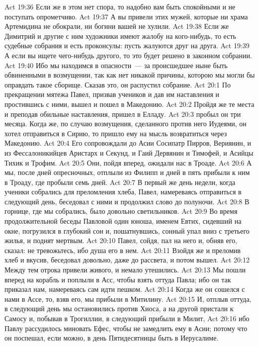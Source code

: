 \vs Act 19:36 Если же в этом нет спора, то надобно вам быть спокойными и не поступать опрометчиво.
\vs Act 19:37 А вы привели этих мужей, которые ни храма Артемидина не обокрали, ни богини вашей не хулили.
\vs Act 19:38 Если же Димитрий и другие с ним художники имеют жалобу на кого-нибудь, то есть судебные собрания и есть проконсулы: пусть жалуются друг на друга.
\vs Act 19:39 А если вы ищете чего-нибудь другого, то это будет решено в законном собрании.
\vs Act 19:40 Ибо мы находимся в опасности~--- за происшедшее ныне быть обвиненными в возмущении, так как нет никакой причины, которою мы могли бы оправдать такое сборище. Сказав это, он распустил собрание.
\vs Act 20:1 По прекращении мятежа Павел, призвав учеников и дав им наставления и простившись с ними, вышел и пошел в Македонию.
\vs Act 20:2 Пройдя же те места и преподав  обильные наставления, пришел в Елладу.
\vs Act 20:3  пробыл он три месяца. Когда же, по случаю возмущения, сделанного против него Иудеями, он хотел отправиться в Сирию, то пришло ему на мысль возвратиться через Македонию.
\vs Act 20:4 Его сопровождали до Асии Сосипатр Пирров, Вериянин, и из Фессалоникийцев Аристарх и Секунд, и Гаий Дервянин и Тимофей, и Асийцы Тихик и Трофим.
\vs Act 20:5 Они, пойдя вперед, ожидали нас в Троаде.
\vs Act 20:6 А мы, после дней опресночных, отплыли из Филипп и дней в пять прибыли к ним в Троаду, где пробыли семь дней.
\rsbpar\vs Act 20:7 В первый же день недели, когда ученики собрались для преломления хлеба, Павел, намереваясь отправиться в следующий день, беседовал с ними и продолжил слово до полуночи.
\vs Act 20:8 В горнице, где мы собрались, было довольно светильников.
\vs Act 20:9 Во время продолжительной беседы Павловой один юноша, именем Евтих, сидевший на окне, погрузился в глубокий сон и, пошатнувшись, сонный упал вниз с третьего жилья, и поднят мертвым.
\vs Act 20:10 Павел, сойдя, пал на него и, обняв его, сказал: не тревожьтесь, ибо душа его в нем.
\vs Act 20:11 Взойдя же и преломив хлеб и вкусив, беседовал довольно, даже до рассвета, и потом вышел.
\vs Act 20:12 Между тем отрока привели живого, и немало утешились.
\rsbpar\vs Act 20:13 Мы пошли вперед на корабль и поплыли в Асс, чтобы взять оттуда Павла; ибо он так приказал нам, намереваясь сам идти пешком.
\vs Act 20:14 Когда же он сошелся с нами в Ассе, то, взяв его, мы прибыли в Митилину.
\vs Act 20:15 И, отплыв оттуда, в следующий день мы остановились против Хиоса, а на другой пристали к Самосу и, побывав в Трогиллии, в следующий  прибыли в Милит,
\vs Act 20:16 ибо Павлу рассудилось миновать Ефес, чтобы не замедлить ему в Асии; потому что он поспешал, если можно, в день Пятидесятницы быть в Иерусалиме.
